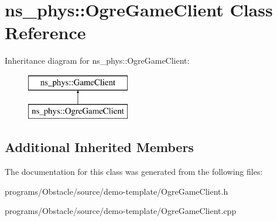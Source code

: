 \hypertarget{classns__phys_1_1_ogre_game_client}{}\section{ns\+\_\+phys\+:\+:Ogre\+Game\+Client Class Reference}
\label{classns__phys_1_1_ogre_game_client}
Inheritance diagram for ns\+\_\+phys\+:\+:Ogre\+Game\+Client\+:\begin{figure}[H]
\begin{center}
\leavevmode
\includegraphics[height=2.000000cm]{classns__phys_1_1_ogre_game_client}
\end{center}
\end{figure}
\subsection*{Additional Inherited Members}


The documentation for this class was generated from the following files\+:\begin{DoxyCompactItemize}
\item 
programs/\+Obstacle/source/demo-\/template/Ogre\+Game\+Client.\+h\item 
programs/\+Obstacle/source/demo-\/template/Ogre\+Game\+Client.\+cpp\end{DoxyCompactItemize}
